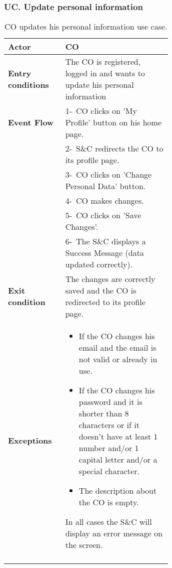 \subsubsection*{UC\cuc . Update personal information}
\begin{center}
    \begin{longtable}{|l|p{0.65\linewidth}|}
        \hline
        \textbf{Actor}            & CO \\
        \hline
        \textbf{Entry conditions} & The CO is registered, logged in and wants to update his personal information\\
        \hline
        \textbf{Event Flow}       & 1-\ CO clicks on 'My Profile' button on his home page. \\
        & 2-\ S\&C redirects the CO to its profile page. \\
        & 3-\ CO clicks on 'Change Personal Data' button.\\
        & 4-\ CO makes changes.\\
        & 5-\ CO clicks on 'Save Changes'.\\
        & 6-\ The S\&C displays a Success Message (data updated correctly).\\
        \hline
        \textbf{Exit condition}   &  The changes are correctly saved and the CO is redirected to its profile page. \\
        \hline
        \textbf{Exceptions}       & \begin{itemize}
            \item If the CO changes his email and the email is not valid or already in use. 
            \item If the CO changes his password and it is shorter than 8 characters or if it doesn’t have at least 1 number and/or 1 capital letter and/or a special character. 
            \item The description about the CO is empty. 
        \end{itemize} In all cases the S\&C will display an error message on the screen.  \\
        \hline
        \caption{CO updates his personal information use case.}
        \label{tab: pi_use_case}
    \end{longtable}
\end{center}

